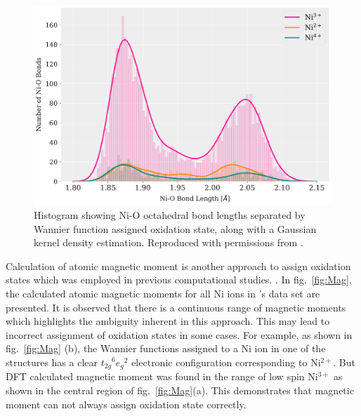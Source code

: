 \documentclass[journal=jacsat,manuscript=article]{achemso}
\begin{document}
\begin{figure}[tb]
  \centering
  \includegraphics[width=0.75\columnwidth]{Figures/JT_all.pdf}
    \caption{\label{fig:JT} Histogram showing Ni-O octahedral bond lengths separated by Wannier function assigned oxidation state, along with a Gaussian kernel density estimation. Reproduced with permissions from .}
\end{figure}

Calculation of atomic magnetic moment is another approach to assign oxidation states which was employed in previous computational studies. \cite{Dixit_JPhysChemC2017, Zheng-acs.jpclett-2017}. 
In fig.\ \ref{fig:Mag}, the calculated atomic magnetic moments for all Ni ions in \citeauthor{rana}'s data set are presented. It is observed that there is a 
continuous range of magnetic moments which highlights the ambiguity inherent in this approach.
This may lead to incorrect assignment of oxidation states in some cases.
For example, as shown in fig.\ \ref{fig:Mag} (b), the Wannier functions assigned to a Ni ion in one of the structures has a clear ${t_{2g}}^{6}{e_{g}}^{2}$ electronic configuration corresponding to Ni$^{2+}$. \citeauthor{rana} But DFT calculated magnetic moment was found in the range of low spin Ni$^{3+}$ as shown in the central region of fig.\ \ref{fig:Mag}(a).\citeauthor{rana} This demonstrates that magnetic moment can not always assign oxidation state correctly.
\end{document}
